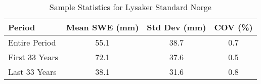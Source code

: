 
    \begin{table}[h!]
        \centering
        \caption{Sample Statistics for Lysaker Standard Norge}
        \begin{tabular}{lccc} 
            \toprule
            \textbf{Period} & \textbf{Mean SWE (mm)} & \textbf{Std Dev (mm)} & \textbf{COV (\%)} \\
            \midrule
            Entire Period & 55.1 & 38.7 & 0.7 \\
            First 33 Years & 72.1 & 37.6 & 0.5 \\
            Last 33 Years & 38.1 & 31.6 & 0.8 \\
            \bottomrule
        \end{tabular}
        \label{tab:sample_stats_Lysaker Standard Norge}
    \end{table}
    